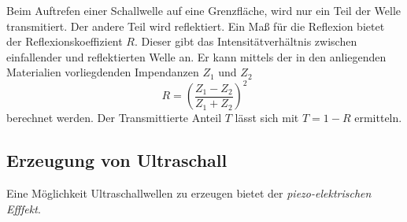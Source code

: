 Beim Auftrefen einer Schallwelle auf eine Grenzfläche, wird nur ein Teil der
Welle transmitiert. Der andere Teil wird reflektiert.
Ein Maß für die Reflexion bietet der Reflexionskoeffizient $R$.
Dieser gibt das Intensitätverhältnis zwischen einfallender und reflektierten Welle an.
Er kann mittels der in den anliegenden Materialien vorliegdenden Impendanzen $Z_1$ und $Z_2$
\begin{equation*}
  R=\left(\frac{Z_1-Z_2}{Z_1+Z_2}\right)^2
\end{equation*}
berechnet werden.
Der Transmittierte Anteil $T$ lässt sich mit $T=1-R$ ermitteln.

\subsection{Erzeugung von Ultraschall}

Eine Möglichkeit Ultraschallwellen zu erzeugen bietet der \emph{piezo-elektrischen Efffekt}.
